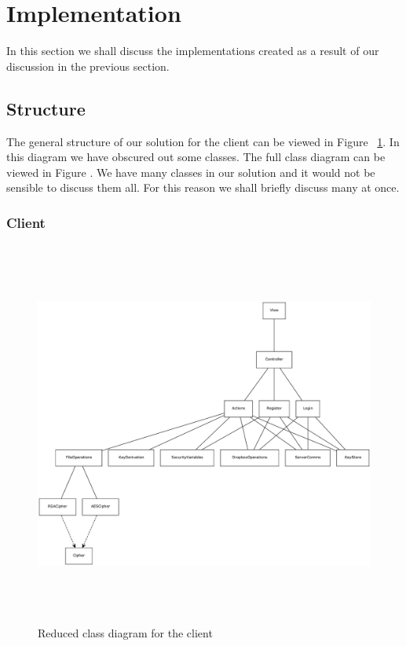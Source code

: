 \documentclass[12pt, titlepage]{article}
\begin{document}
\section{Implementation}
In this section we shall discuss the implementations created as a result of our discussion in the previous section.
\subsection{Structure}
The general structure of our solution for the client can be viewed in Figure ~\ref{fig:reducedClientClass}. In this diagram we have obscured out some classes. The full class diagram can be viewed in Figure .
\newline \indent We have many classes in our solution and it would not be sensible to discuss them all. For this reason we shall briefly discuss many at once.

\subsubsection{Client}

\begin{figure}
\centerline{\includegraphics[height=5.0in,width=8in,angle=0]{client-classDiagram.pdf}}
\caption{Reduced class diagram for the client}
\label{fig:reducedClientClass}
\end{figure}
\end{document}
